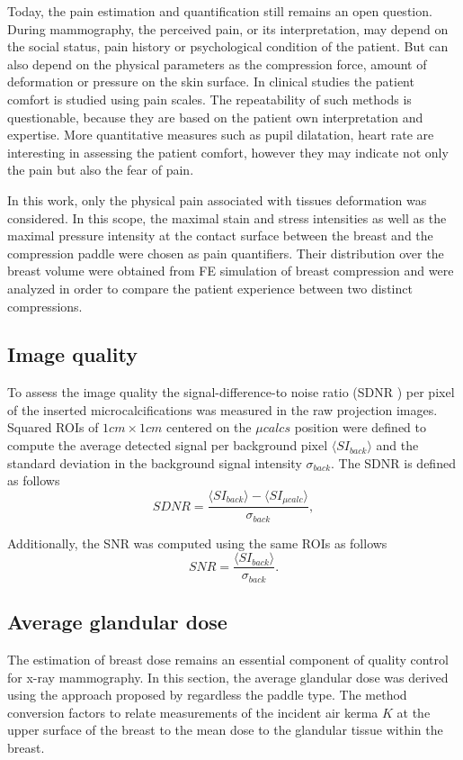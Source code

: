 Today, the pain estimation and quantification still remains an open question. During mammography, the perceived pain, or its interpretation, may depend on the social status, pain history or psychological condition of the patient. But can also depend on the physical parameters as the compression force, amount of deformation or pressure on the skin surface. In clinical studies the patient comfort is studied using pain scales. The repeatability of such methods is questionable, because they are based on the patient own interpretation and expertise. More quantitative measures such as pupil dilatation, heart rate are interesting in assessing the patient comfort, however they may indicate not only the pain but also the fear of pain.        

In this work, only the physical pain associated with tissues deformation was considered. In this scope, the maximal stain and stress intensities as well as the maximal pressure intensity at the contact surface between the breast and the compression paddle were chosen as pain quantifiers. Their distribution over the breast volume were obtained from FE simulation of breast compression and were analyzed in order to compare the patient experience between two distinct compressions. 

\subsection{Image quality }\label{section:averagegalndulardose}
 To assess the image quality the signal-difference-to noise ratio (SDNR ) per pixel of the inserted microcalcifications was measured in the raw projection images. Squared ROIs of $1cm \times 1cm$ centered on the $\mu calcs$ position were defined to compute the average detected signal per background pixel $\langle SI_{back}\rangle$ and the standard deviation in the background signal intensity $\sigma_{back}$. The SDNR is defined as follows
 \begin{equation}
 SDNR = \frac{\langle SI_{back}\rangle - \langle SI_{\mu calc}\rangle}{\sigma_{back}},
\end{equation}

 
Additionally, the SNR was computed using the same ROIs as follows  
 \begin{equation}
 SNR = \frac{\langle SI_{back}\rangle}{\sigma_{back}}.
\end{equation}



\subsection{Average glandular dose}
The estimation of breast dose remains an essential component of quality control for x-ray mammography. In this section, the average glandular dose was derived using the approach proposed by \cite{dance_additional_2000} regardless the paddle type. The method conversion factors to relate measurements of the incident air kerma $K$ at the upper surface of the breast to the mean dose to the glandular tissue within the breast. 

